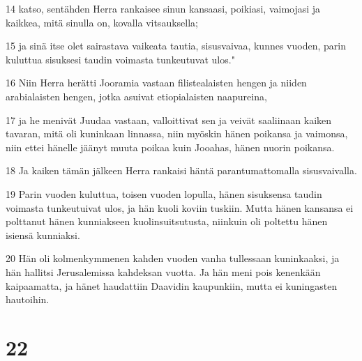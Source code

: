 \par 14 katso, sentähden Herra rankaisee sinun kansaasi, poikiasi, vaimojasi ja kaikkea, mitä sinulla on, kovalla vitsauksella;
\par 15 ja sinä itse olet sairastava vaikeata tautia, sisusvaivaa, kunnes vuoden, parin kuluttua sisuksesi taudin voimasta tunkeutuvat ulos."
\par 16 Niin Herra herätti Jooramia vastaan filistealaisten hengen ja niiden arabialaisten hengen, jotka asuivat etiopialaisten naapureina,
\par 17 ja he menivät Juudaa vastaan, valloittivat sen ja veivät saaliinaan kaiken tavaran, mitä oli kuninkaan linnassa, niin myöskin hänen poikansa ja vaimonsa, niin ettei hänelle jäänyt muuta poikaa kuin Jooahas, hänen nuorin poikansa.
\par 18 Ja kaiken tämän jälkeen Herra rankaisi häntä parantumattomalla sisusvaivalla.
\par 19 Parin vuoden kuluttua, toisen vuoden lopulla, hänen sisuksensa taudin voimasta tunkeutuivat ulos, ja hän kuoli koviin tuskiin. Mutta hänen kansansa ei polttanut hänen kunniakseen kuolinsuitsutusta, niinkuin oli poltettu hänen isiensä kunniaksi.
\par 20 Hän oli kolmenkymmenen kahden vuoden vanha tullessaan kuninkaaksi, ja hän hallitsi Jerusalemissa kahdeksan vuotta. Ja hän meni pois kenenkään kaipaamatta, ja hänet haudattiin Daavidin kaupunkiin, mutta ei kuningasten hautoihin.

\chapter{22}

